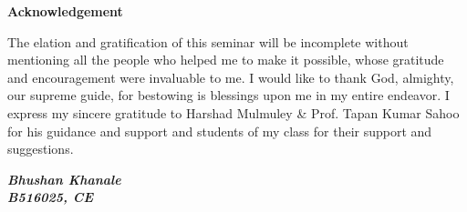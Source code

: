 \vspace{1in}
\centerline{\Large{\bf Acknowledgement}}
\vspace{.75cm}
\noindent
The elation and gratification of this seminar will be incomplete without
mentioning all the people who helped me to make it possible, whose gratitude
and encouragement were invaluable to me. I would like to thank God, almighty,
our supreme guide, for bestowing is blessings upon me in my entire endeavor.
I express my sincere gratitude to  Harshad Mulmuley \& Prof. Tapan Kumar Sahoo
for his guidance and support and students of my class for their support and
suggestions.
\\
\begin{flushright}
{\textit{\textbf{Bhushan Khanale}}}\\
{\textit{\textbf{B516025, CE}}}\\
\end{flushright}
